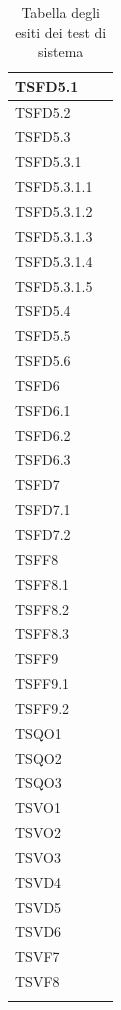 \begin{center}
\begin{longtable}{ | >{\centering\arraybackslash}m{5cm} | >{\centering\arraybackslash}m{5cm} | }
				TSFD5.1 & \done{} \\ \hline
				TSFD5.2 & \done{} \\ \hline
				TSFD5.3 & \done{} \\ \hline
				TSFD5.3.1 & \done{} \\ \hline
				TSFD5.3.1.1 & \done{} \\ \hline
				TSFD5.3.1.2 & \done{} \\ \hline
				TSFD5.3.1.3 & \done{} \\ \hline
				TSFD5.3.1.4 & \done{} \\ \hline
				TSFD5.3.1.5 & \done{} \\ \hline
				TSFD5.4 & \done{} \\ \hline
				TSFD5.5 & \done{} \\ \hline
				TSFD5.6 & \done{} \\ \hline
				TSFD6 & \done{} \\ \hline
				TSFD6.1 & \done{} \\ \hline
				TSFD6.2 & \done{} \\ \hline
				TSFD6.3 & \done{} \\ \hline
				TSFD7 & \done{} \\ \hline
				TSFD7.1 & \done{} \\ \hline
				TSFD7.2 & \done{} \\ \hline
				TSFF8 & \done{} \\ \hline
				TSFF8.1 & \done{} \\ \hline
				TSFF8.2 & \done{} \\ \hline
				TSFF8.3 & \done{} \\ \hline
				TSFF9 & \done{} \\ \hline
				TSFF9.1 & \done{} \\ \hline
				TSFF9.2 & \done{} \\ \hline
				TSQO1 & \done{} \\ \hline
				TSQO2 & \done{} \\ \hline
				TSQO3 & \done{} \\ \hline
				TSVO1 & \done{} \\ \hline
				TSVO2 & \done{} \\ \hline
				TSVO3 & \done{} \\ \hline
				TSVD4 & \done{} \\ \hline
				TSVD5 & \done{} \\ \hline
				TSVD6 & \done{} \\ \hline
				TSVF7 & \done{} \\ \hline
				TSVF8 & \done{} \\ \hline
			\caption[Esiti test di sistema]{Tabella degli esiti dei test di sistema}
			
			\end{longtable}
				
			\end{center}
			
